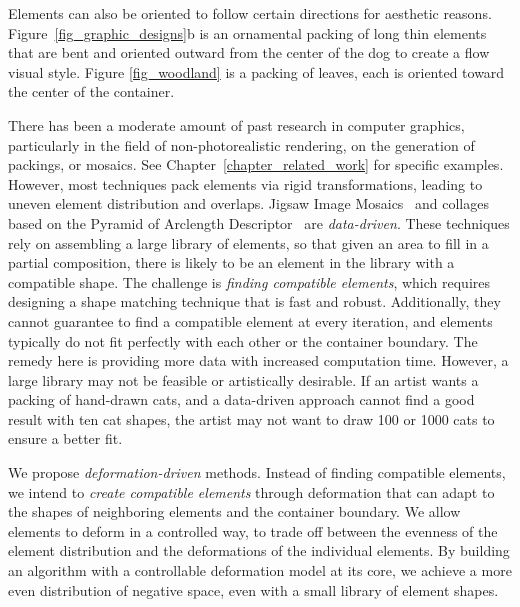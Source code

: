 
\newtext
{
Elements can also be oriented to follow certain directions for aesthetic reasons.
Figure~\ref{fig_graphic_designs}b is an ornamental packing
of long thin elements that are bent and oriented outward from the center of the dog to create a flow visual style.
Figure \ref{fig_woodland} is a packing of leaves, each is oriented toward the center of the container.
}

\newtext
{
There has been a moderate amount of past research in computer
graphics, particularly in the field of non-photorealistic rendering,
on the generation of packings, or mosaics.  
See Chapter~\ref{chapter_related_work} for specific examples.  
However,  most techniques pack elements via rigid transformations, leading to
uneven element distribution and overlaps.  
Jigsaw Image Mosaics~\cite{Kim2002} and collages based on the Pyramid of Arclength
Descriptor~\cite{Kwan2016} are \textit{data-driven}.
These techniques rely on assembling a large library of elements, so that given an
area to fill in a partial composition, there is likely to be an
element in the library with a compatible shape.  The challenge is 
\textit{finding compatible elements},
which requires designing a shape matching technique that is fast and robust.
Additionally, they cannot guarantee to find a compatible element
at every iteration, and elements typically do not fit perfectly with each other 
or the container boundary.
The remedy here is providing more data with increased computation time.
However, a large library may not be feasible or artistically desirable.
If an artist wants a packing of hand-drawn cats, and a data-driven approach 
cannot find a good result with ten cat shapes, 
the artist may not want to draw 100 or 1000 cats to ensure a better fit.
}

\newtext
{
We propose \textit{deformation-driven} methods.
Instead of finding compatible elements,
we intend to \textit{create compatible elements} through deformation
that can adapt to the shapes of neighboring elements and the container boundary.
We allow elements to deform in a controlled way,
to trade off between the evenness of the element distribution and 
the deformations of the individual elements.
By building an algorithm with a controllable deformation model at its core, we achieve a
more even distribution of negative space, even with a small library of element shapes.
}

